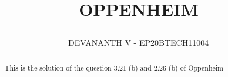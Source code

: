 \documentclass[journal,12pt,twocolumn]{IEEEtran}
\renewcommand\thesection{\arabic{section}}
\begin{document}
	\makeatletter
	\makeatother
	\let\StandardTheFigure\thefigure
	\renewcommand{\thefigure}{\theproblem}
	\def\putbox#1#2#3{\makebox[0in][l]{\makebox[#1][l]{}\raisebox{\baselineskip}[0in][0in]{\raisebox{#2}[0in][0in]{#3}}}}
	\def\rightbox#1{\makebox[0in][r]{#1}}
	\def\centbox#1{\makebox[0in]{#1}}
	\def\topbox#1{\raisebox{-\baselineskip}[0in][0in]{#1}}
	\def\midbox#1{\raisebox{-0.5\baselineskip}[0in][0in]{#1}}
	\vspace{3cm}
	\title{ 
		
		OPPENHEIM
	
	}
\author{ DEVANANTH V - EP20BTECH11004$^{}$}	
\maketitle
\tableofcontents

\renewcommand{\thefigure}{\theenumi}
\renewcommand{\thetable}{\theenumi}
\bigskip
\begin{abstract}
This is the solution of the question 3.21 (b) and 2.26 (b) of Oppenheim
\end{abstract}
\end{document}
